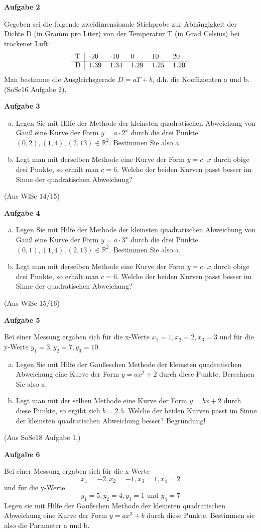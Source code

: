\documentclass[a4paper,12pt]{article}
\newcommand{\Aufgabe}[1]{
  {
  \vspace*{0.5cm}
  \textsf{\textbf{Aufgabe #1}}
  \vspace*{0.2cm}
  
  }
}
\begin{document}
\Aufgabe{2}
Gegeben sei die folgende zweidimensionale Stichprobe zur Abhängigkeit der Dichte D (in Gramm pro Liter) von der Temperatur T (in Grad Celsius) bei trockener Luft:
$$
\begin{tabular}[h]{l|lllll}
T & -20 & -10 & 0 & 10 & 20 \\
\hline
D & 1.39 & 1.34 & 1.29 & 1.25 & 1.20 \\
\end{tabular}
$$
Man bestimme die Ausgleichsgerade $D=aT + b$, d.h. die Koeffizienten a und b.
 (SoSe16 Aufgabe 2).
 
\Aufgabe{3}
\begin{enumerate}[a)]
\item Legen Sie mit Hilfe der Methode der kleinsten quadratischen Abweichung von Gauß eine Kurve der Form $y=a\cdot 2^x$ durch die drei Punkte $(0,2),(1,4),(2,13)\in \mathbb{R}^2$. Bestimmen Sie also a.
\item Legt man mit derselben Methode eine Kurve der Form $y=c\cdot x$ durch obige drei Punkte, so erhält man $c=6$. Welche der beiden Kurven passt besser im Sinne der quadratischen Abweichung?
\end{enumerate}
(Aus WiSe 14/15) 


\Aufgabe{4}
\begin{enumerate}[a)]
\item Legen Sie mit Hilfe der Methode der kleinsten quadratischen Abweichung von Gauß eine Kurve der Form $y=a\cdot 3^x$ durch die drei Punkte $(0,1),(1,4),(2,13)\in \mathbb{R}^2$. Bestimmen Sie also a.
\item Legt man mit derselben Methode eine Kurve der Form $y=c\cdot x$ durch obige drei Punkte, so erhält man $c=6$. Welche der beiden Kurven passt besser im Sinne der quadratischen Abweichung?
\end{enumerate}
(Aus WiSe 15/16) 

\Aufgabe{5}
Bei einer Messung ergaben sich für die x-Werte $x_1 =1, x_2=2, x_3=3 $ und für die y-Werte $y_1=3, y_2=7, y_3=10$.
\begin{enumerate}[a)]
\item
Legen Sie mit Hilfe der Gaußeschen Methode der kleinsten quadratischen Abweichung eine Kurve der Form $y=ax^2 + 2$ durch diese Punkte. Berechnen Sie also a.
\item
Legt man mit der selben Methode eine Kurve der Form $y=bx+2$ durch diese Punkte, so ergibt sich $b=2.5$. Welche der beiden Kurven passt im Sinne der kleinsten quadratischen Abweichung besser? Begründung! 
\end{enumerate}
(Aus SoSe18 Aufgabe 1.)

\Aufgabe{6}
Bei einer Messung ergaben sich für die x-Werte
$$
x_1= -2, x_2=-1, x_3=1, x_4=2
$$
und für die y-Werte
$$
y_1=5, y_2=4, y_3=1 \text{ und } y_4=7
$$
Legen sie mit Hilfe der Gaußschen Methode der kleinsten quadratischen Abweichung eine Kurve der Form $y=ax^3 +b$ durch diese Punkte. Bestimmen sie also die Parameter a und b.


\end{document}
